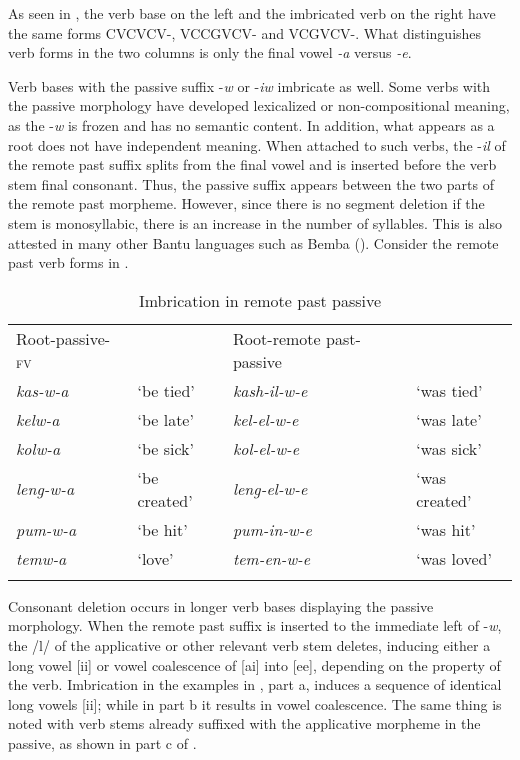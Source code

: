 \documentclass[output=paper]{langsci/langscibook}
\begin{document}
As seen in , the verb base on the left and the imbricated verb on the right have the same forms CVCVCV-, VCCGVCV- and VCGVCV-. What distinguishes verb forms in the two columns is only the final vowel \textit{-a} versus \textit{-e}.

 
Verb bases with the passive suffix -\textit{w} or -\textit{iw }imbricate as well. Some verbs with the passive morphology have developed lexicalized or non-compositional meaning, as the -\textit{w} is frozen and has no semantic content. In addition, what appears as a root does not have independent meaning. When attached to such verbs, the -\textit{il} of the remote past suffix splits from the final vowel and is inserted before the verb stem final consonant. Thus, the passive suffix appears between the two parts of the remote past morpheme. However, since there is no segment deletion if the stem is monosyllabic, there is an increase in the number of syllables. This is also attested in many other Bantu languages such as Bemba (\citealt{chebanne1993,hyman1995,kula2002}). Consider the remote past verb forms in .
 

\begin{table}
\begin{tabular}{llll}
\lsptoprule
Root-passive-\textsc{fv} &  & Root-remote past-passive & \\
\textit{kas-w-a} & `be tied' & \textit{kash-il-w-e} & `was tied' \\
\textit{kelw-a} & `be late' & \textit{kel-el-w-e} & `was late' \\
\textit{kolw-a} & `be sick' & \textit{kol-el-w-e} & `was sick' \\
\textit{leng-w-a} & `be created' & \textit{leng-el-w-e} & `was created' \\
\textit{pum-w-a} & `be hit' & \textit{pum-in-w-e} & `was hit' \\
\textit{temw-a} & `love' & \textit{tem-en-w-e} & `was loved' \\

\lspbottomrule
\end{tabular}

\caption{Imbrication in remote past passive}
\label{tab:25.kawasha}

\end{table}

Consonant deletion occurs in longer verb bases displaying the passive morphology. When the remote past suffix is inserted to the immediate left of -\textit{w}, the /l/ of the applicative or other relevant verb stem deletes, inducing either a long vowel [ii] or vowel coalescence of [ai] into [ee], depending on the property of the verb. Imbrication in the examples in , part a, induces a sequence of identical long vowels [ii]; while in part b it results in vowel coalescence. The same thing is noted with verb stems already suffixed with the applicative morpheme in the passive, as shown in part c of .
\end{document}
